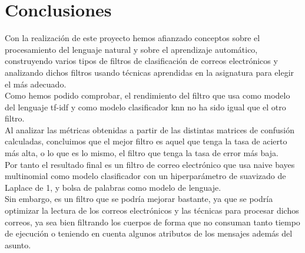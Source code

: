 \documentclass[conference,a4paper]{IEEEtran}
\begin{document}
\section{Conclusiones}

Con la realización de este proyecto hemos afianzado conceptos sobre el procesamiento del lenguaje natural y sobre el aprendizaje automático, construyendo varios tipos de filtros de clasificación de correos electrónicos y analizando dichos filtros usando técnicas aprendidas en la asignatura para elegir el más adecuado. \\

Como hemos podido comprobar, el rendimiento del filtro que usa como modelo del lenguaje tf-idf y como modelo clasificador knn no ha sido igual que el otro filtro. \\

Al analizar las métricas obtenidas a partir de las distintas matrices de confusión calculadas, concluimos que el mejor filtro es aquel que tenga la tasa de acierto más alta, o lo que es lo mismo, el filtro que tenga la tasa de error más baja. \\

Por tanto el resultado final es un filtro de correo electrónico que usa naive bayes multinomial como modelo clasificador con un hiperparámetro de suavizado de Laplace de 1, y bolsa de palabras como modelo de lenguaje. \\

Sin embargo, es un filtro que se podría mejorar bastante, ya que se podría optimizar la lectura de los correos electrónicos y las técnicas para procesar dichos correos, ya sea bien filtrando los cuerpos de forma que no consuman tanto tiempo de ejecución o teniendo en cuenta algunos atributos de los mensajes además del asunto. \\
\end{document}
